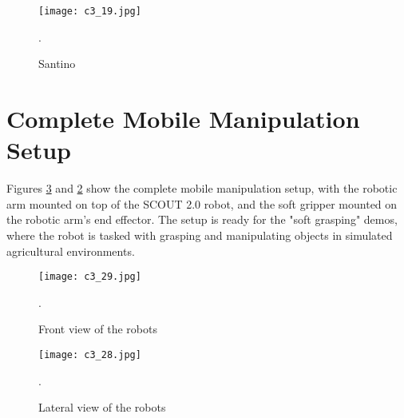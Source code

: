 \begin{figure}[t]
    \centering
    \texttt{[image: c3\_19.jpg]}
    \captionsetup{width=1\linewidth}
    \caption{Santino}.
    \label{fig:c3_img19}
\end{figure}

\section{Complete Mobile Manipulation Setup}

Figures \ref{fig:c3_img28} and \ref{fig:c3_img29} show the complete mobile manipulation setup, with the robotic arm
mounted on top of the SCOUT 2.0 robot, and the soft gripper mounted on the robotic arm's end effector.
The setup is ready for the "soft grasping" demos, where the robot is tasked with grasping and manipulating objects
in simulated agricultural environments.

\begin{figure}[t]
    \centering
    \texttt{[image: c3\_29.jpg]}
    \captionsetup{width=1\linewidth}
    \caption{Front view of the robots}.
    \label{fig:c3_img29}
\end{figure}

\begin{figure}[t]
    \centering
    \texttt{[image: c3\_28.jpg]}
    \captionsetup{width=1\linewidth}
    \caption{Lateral view of the robots}.
    \label{fig:c3_img28}
\end{figure}
